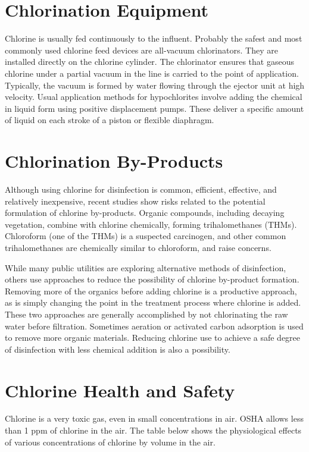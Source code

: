 \documentclass[10pt]{article}
\begin{document}
\section{Chlorination Equipment}
Chlorine is usually fed continuously to the influent. Probably the safest and most commonly used chlorine feed devices are all-vacuum chlorinators. They are installed directly on the chlorine cylinder. The chlorinator ensures that gaseous chlorine under a partial vacuum in the line is carried to the point of application. Typically, the vacuum is formed by water flowing through the ejector unit at high velocity. Usual application methods for hypochlorites involve adding the chemical in liquid form using positive displacement pumps. These deliver a specific amount of liquid on each stroke of a piston or flexible diaphragm.

\section{Chlorination By-Products}
Although using chlorine for disinfection is common, efficient, effective, and relatively inexpensive, recent studies show risks related to the potential formulation of chlorine by-products. Organic compounds, including decaying vegetation, combine with chlorine chemically, forming trihalomethanes (THMs). Chloroform (one of the THMs) is a suspected carcinogen, and other common trihalomethanes are chemically similar to chloroform, and raise concerns.

While many public utilities are exploring alternative methods of disinfection, others use approaches to reduce the possibility of chlorine by-product formation. Removing more of the organics before adding chlorine is a productive approach, as is simply changing the point in the treatment process where chlorine is added. These two approaches are generally accomplished by not chlorinating the raw water before filtration. Sometimes aeration or activated carbon adsorption is used to remove more organic materials. Reducing chlorine use to achieve a safe degree of disinfection with less chemical addition is also a possibility.

\section{Chlorine Health and Safety}
Chlorine is a very toxic gas, even in small concentrations in air. OSHA allows less than 1 ppm of chlorine in the air. The table below shows the physiological effects of various concentrations of chlorine by volume in the air.
\end{document}
